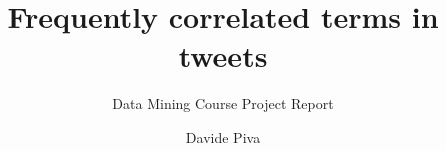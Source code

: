 \documentclass[sigconf,edbt]{acmart-edbt2021}
\begin{document}
\title{Frequently correlated terms in tweets}
\subtitle{Data Mining Course Project Report}
  

\author{Davide Piva}


\maketitle





\end{document}
